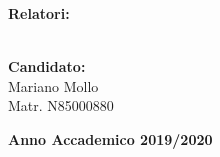 \begin{titlepage}
\begin{addmargin}[-1cm]{-3cm}
        \vfill

        \vspace{25mm}
        \par
        \noindent
        \begin{minipage}[t]{0.47\textwidth}
            \textbf{Relatori:}\\
            \myProf\\
            \myOtherProf
        \end{minipage}
        \hfill
        \begin{minipage}[t]{0.47\textwidth}\raggedleft
            \textbf{Candidato:}\\
            Mariano Mollo\\
            Matr. N85000880
        \end{minipage}
        \vspace{5.5mm}
        \begin{center}
            {\large{\textbf{Anno Accademico 2019/2020}}}
        \end{center}
    \end{addmargin}
    \end{titlepage}